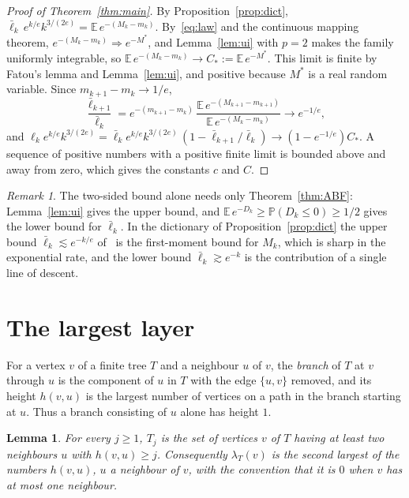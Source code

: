 \documentclass[11pt]{amsart}
\newtheorem{lemma}[theorem]{Lemma}
\theoremstyle{definition}
\theoremstyle{remark}
\newtheorem{remark}[theorem]{Remark}
\numberwithin{equation}{section}
\newcommand{\PP}{\mathbb P}
\newcommand{\E}{\mathbb E}
\newcommand{\lb}{\bar\ell}
\begin{document}
\begin{proof}[Proof of Theorem~\ref{thm:main}]
By Proposition~\ref{prop:dict}, $\lb_k\,e^{k/e}k^{3/(2e)}=\E\,e^{-(M_k-m_k)}$. By~\eqref{eq:law} and the continuous mapping theorem, $e^{-(M_k-m_k)}\Rightarrow e^{-M^*}$, and Lemma~\ref{lem:ui} with $p=2$ makes the family uniformly integrable, so $\E\,e^{-(M_k-m_k)}\to C_*:=\E\,e^{-M^*}$. This limit is finite by Fatou's lemma and Lemma~\ref{lem:ui}, and positive because $M^*$ is a real random variable. Since $m_{k+1}-m_k\to1/e$,
\[
\frac{\lb_{k+1}}{\lb_k}=e^{-(m_{k+1}-m_k)}\,\frac{\E\,e^{-(M_{k+1}-m_{k+1})}}{\E\,e^{-(M_k-m_k)}}\to e^{-1/e},
\]
and $\ell_k e^{k/e}k^{3/(2e)}=\lb_k e^{k/e}k^{3/(2e)}\,(1-\lb_{k+1}/\lb_k)\to(1-e^{-1/e})C_*$. A sequence of positive numbers with a positive finite limit is bounded above and away from zero, which gives the constants $c$ and $C$.
\end{proof}

\begin{remark}
The two-sided bound alone needs only Theorem~\ref{thm:ABF}: Lemma~\ref{lem:ui} gives the upper bound, and $\E\,e^{-D_k}\ge\PP(D_k\le0)\ge1/2$ gives the lower bound for $\lb_k$. In the dictionary of Proposition~\ref{prop:dict} the upper bound $\lb_k\lesssim e^{-k/e}$ of~\cite[Theorem~4]{SKHK} is the first-moment bound for $M_k$, which is sharp in the exponential rate, and the lower bound $\lb_k\gtrsim e^{-k}$ is the contribution of a single line of descent.
\end{remark}

\section{The largest layer}\label{sec:max}

For a vertex $v$ of a finite tree $T$ and a neighbour $u$ of $v$, the \emph{branch} of $T$ at $v$ through $u$ is the component of $u$ in $T$ with the edge $\{u,v\}$ removed, and its height $h(v,u)$ is the largest number of vertices on a path in the branch starting at $u$. Thus a branch consisting of $u$ alone has height $1$.

\begin{lemma}\label{lem:strip}
For every $j\ge1$, $T_j$ is the set of vertices $v$ of $T$ having at least two neighbours $u$ with $h(v,u)\ge j$. Consequently $\lambda_T(v)$ is the second largest of the numbers $h(v,u)$, $u$ a neighbour of $v$, with the convention that it is $0$ when $v$ has at most one neighbour.
\end{lemma}
\end{document}
